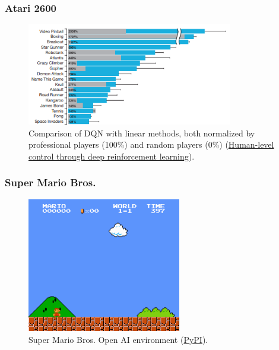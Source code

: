 \documentclass{beamer}
\begin{document}
        \begin{frame}
            \frametitle{Atari 2600}
            
            \begin{figure}[]
                \centering
                \includegraphics[width=0.8\textwidth]{figures/comparison2}
                \caption{Comparison of DQN with linear methods, both normalized by professional players (100\%) and random players (0\%) (\href{https://storage.googleapis.com/deepmind-data/assets/papers/DeepMindNature14236Paper.pdf}{Human-level control through deep reinforcement learning}).}
                \label{fig12:atari}
            \end{figure}
        
        \end{frame}

        \begin{frame}
            \frametitle{Super Mario Bros.}
        
            \begin{figure}
                \centering
                \includegraphics[width=0.6\textwidth]{figures/super_mario_bros.png}
                \caption{Super Mario Bros. Open AI environment (\href{https://pypi.org/project/gym-super-mario-bros/}{PyPI}).}
                \label{fig13:mario}
            \end{figure}
        
        \end{frame}
\end{document}

